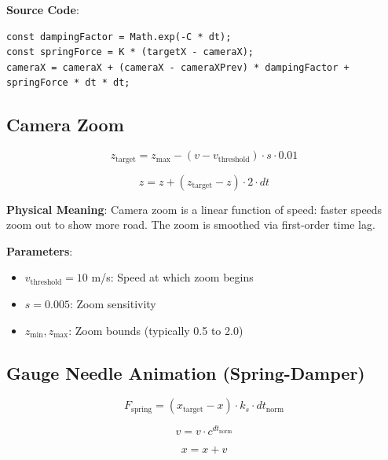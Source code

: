 \textbf{Source Code}: 

\begin{lstlisting}[caption={Verlet camera with spring-damper}]
const dampingFactor = Math.exp(-C * dt);
const springForce = K * (targetX - cameraX);
cameraX = cameraX + (cameraX - cameraXPrev) * dampingFactor + springForce * dt * dt;
\end{lstlisting}

\subsection{Camera Zoom}

\begin{equation}
  z_{\text{target}} = z_{\text{max}} - (v - v_{\text{threshold}}) \cdot s \cdot 0.01
  \label{eq:camera-zoom}
\end{equation}

\begin{equation}
  z = z + (z_{\text{target}} - z) \cdot 2 \cdot dt
  \label{eq:zoom-smoothing}
\end{equation}

\textbf{Physical Meaning}: Camera zoom is a linear function of speed: faster speeds zoom out to show more road. The zoom is smoothed via first-order time lag.

\textbf{Parameters}:
\begin{itemize}
  \item $v_{\text{threshold}} = 10$ m/s: Speed at which zoom begins
  \item $s = 0.005$: Zoom sensitivity
  \item $z_{\text{min}}, z_{\text{max}}$: Zoom bounds (typically 0.5 to 2.0)
\end{itemize}

\subsection{Gauge Needle Animation (Spring-Damper)}

\begin{equation}
  F_{\text{spring}} = (x_{\text{target}} - x) \cdot k_s \cdot dt_{\text{norm}}
  \label{eq:needle-spring}
\end{equation}

\begin{equation}
  v = v \cdot c^{dt_{\text{norm}}}
  \label{eq:needle-damping}
\end{equation}

\begin{equation}
  x = x + v
  \label{eq:needle-update}
\end{equation}

